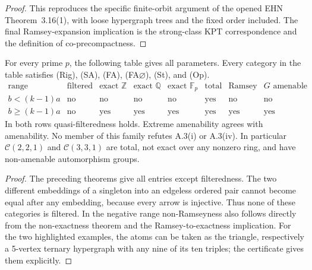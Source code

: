 \begin{proof}
This reproduces the specific finite-orbit argument of the opened
EHN Theorem~3.16(1), with loose hypergraph trees and the fixed order
included. The final Ramsey-expansion implication is the strong-class
KPT correspondence and the definition of co-precompactness.
\end{proof}

\begin{corollary}
\label{D:table}
For every prime $p$, the following table gives all parameters.
Every category in the table satisfies (Rig), (SA), (FA),
(FA$\varnothing$), (St), and (Op).
\[
\begin{array}{c|ccccccc}
 \text{range}&\text{filtered}&\text{exact }\mathbb Z&
 \text{exact }\mathbb Q&\text{exact }\mathbb F_p&
 \text{total}&\text{Ramsey}&G\text{ amenable}\\ \hline
 b<(k-1)a&\text{no}&\text{no}&\text{no}&\text{no}&
 \text{yes}&\text{no}&\text{no}\\
 b\geq(k-1)a&\text{no}&\text{yes}&\text{yes}&\text{yes}&
 \text{yes}&\text{yes}&\text{yes}
\end{array}
\]
In both rows quasi-filteredness holds. Extreme amenability agrees
with amenability. No member of this family refutes A.3(i) or A.3(iv).
In particular $\mathcal C(2,2,1)$ and $\mathcal C(3,3,1)$ are total,
not exact over any nonzero ring, and have non-amenable automorphism
groups.
\end{corollary}
\begin{proof}
The preceding theorems give all entries except filteredness.
The two different embeddings of a singleton into an edgeless ordered
pair cannot become equal after any embedding, because every arrow
is injective. Thus none of these categories is filtered. In the
negative range non-Ramseyness also follows directly from the
non-exactness theorem and the Ramsey-to-exactness implication.
For the two highlighted examples, the atoms can be taken as the
triangle, respectively a 5-vertex ternary hypergraph with any nine
of its ten triples; the certificate gives them explicitly.
\end{proof}

